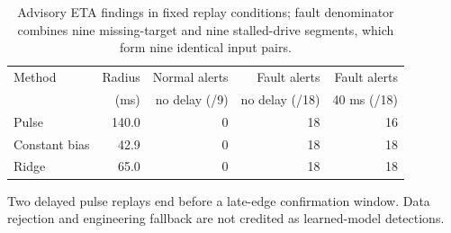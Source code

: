 \begin{table}[t]
\caption{Advisory ETA findings in fixed replay conditions; fault denominator combines nine missing-target and nine stalled-drive segments, which form nine identical input pairs.}
\label{tab:eta-monitor}
\centering\small
\begin{tabular}{lrrrr}
\toprule
Method & Radius & Normal alerts & Fault alerts & Fault alerts\\
 & (ms) & no delay (/9) & no delay (/18) & 40 ms (/18)\\
\midrule
Pulse & 140.0 & 0 & 18 & 16\\
Constant bias & 42.9 & 0 & 18 & 18\\
Ridge & 65.0 & 0 & 18 & 18\\
\bottomrule
\end{tabular}
\par\smallskip\footnotesize Two delayed pulse replays end before a late-edge confirmation window. Data rejection and engineering fallback are not credited as learned-model detections.
\end{table}

